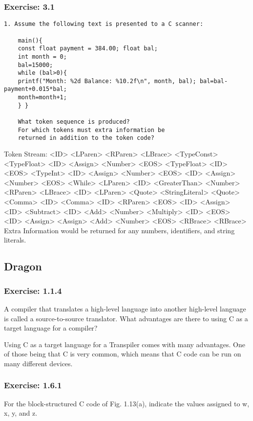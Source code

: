 \documentclass[letterpaper, 10pt,DIV=13]{scrartcl}
\numberwithin{equation}{section} %
\numberwithin{figure}{section} %
\numberwithin{table}{section} %
\begin{document}
\subsubsection*{Exercise: 3.1}
    \lstset{numbers=left, numberstyle=\tiny, stepnumber=1, numbersep=5pt, basicstyle=\footnotesize\ttfamily}
    \begin{lstlisting}[frame=single, ]
    1. Assume the following text is presented to a C scanner:

    main(){
    const float payment = 384.00; float bal;
    int month = 0;
    bal=15000;
    while (bal>0){
    printf("Month: %2d Balance: %10.2f\n", month, bal); bal=bal-payment+0.015*bal;
    month=month+1;
    } }

    What token sequence is produced? 
    For which tokens must extra information be
    returned in addition to the token code?
\end{lstlisting}
Token Stream: <ID> <LParen> <RParen> <LBrace> <TypeConst> <TypeFloat> <ID> <Assign> <Number> <EOS> <TypeFloat> <ID> <EOS> <TypeInt> <ID> <Assign> <Number> <EOS> <ID> <Assign> <Number> <EOS> <While> <LParen> <ID> <GreaterThan> <Number> <RParen> <LBrace> <ID> <LParen> <Quote> <StringLiteral> <Quote> <Comma> <ID> <Comma> <ID> <RParen> <EOS> <ID> <Assign> <ID> <Subtract> <ID> <Add> <Number> <Multiply> <ID> <EOS> <ID> <Assign> <Assign> <Add> <Number> <EOS> <RBrace> <RBrace>
\newline
Extra Information would be returned for any numbers, identifiers, and string literals.

\subsection*{Dragon}

\subsubsection*{Exercise: 1.1.4}
    A compiler that translates a high-level language into another high-level language is called a source-to-source translator. What advantages are there to using C as a target language for a compiler?

    Using C as a target language for a Transpiler comes with many advantages. One of those being that C is very common, which means that C code can be run on many different devices.
    
\subsubsection*{Exercise: 1.6.1}
For the block-structured C code of Fig. 1.13(a), indicate the values assigned to w, x, y, and z.
\end{document}
